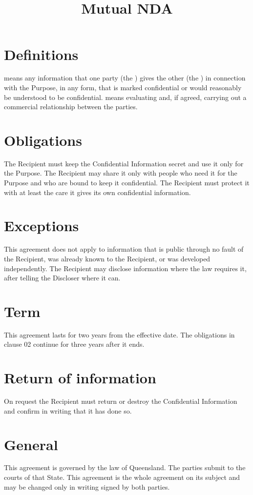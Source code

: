\documentclass{jupiter-agreement}
\title{Mutual NDA}
\begin{document}
\maketitle
{}
\jprowend

\section{Definitions}
\clause {} means any information that one party (the ) gives the other (the ) in connection with the Purpose, in any form, that is marked confidential or would reasonably be understood to be confidential.
\clause {} means evaluating and, if agreed, carrying out a commercial relationship between the parties.

\section{Obligations}
\clause The Recipient must keep the Confidential Information secret and use it only for the Purpose.
\clause The Recipient may share it only with people who need it for the Purpose and who are bound to keep it confidential.
\clause The Recipient must protect it with at least the care it gives its own confidential information.

\section{Exceptions}
\clause This agreement does not apply to information that is public through no fault of the Recipient, was already known to the Recipient, or was developed independently.
\clause The Recipient may disclose information where the law requires it, after telling the Discloser where it can.

\section{Term}
\clause This agreement lasts for two years from the effective date. The obligations in clause 02 continue for three years after it ends.

\section{Return of information}
\clause On request the Recipient must return or destroy the Confidential Information and confirm in writing that it has done so.

\section{General}
\clause This agreement is governed by the law of Queensland. The parties submit to the courts of that State.
\clause This agreement is the whole agreement on its subject and may be changed only in writing signed by both parties.

\end{document}
